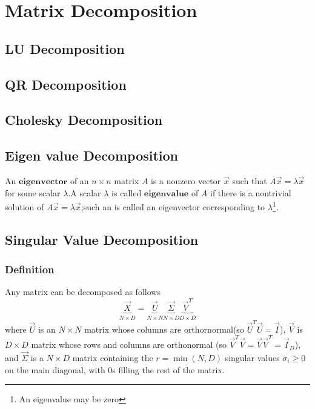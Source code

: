 \chapter{Matrix Decomposition}
\label{chapter:Matrix Decomposition}
\section{LU Decomposition}
\section{QR Decomposition}
\section{Cholesky Decomposition}
\section{Eigen value Decomposition}
\begin{definition}
	An $\mathbf{eigenvector}$ of an $n\times n$ matrix $A$ is a nonzero vector $\vec{x}$ such that $A\vec{x}=\lambda\vec{x}$ for some scalar $\lambda$.A scalar $\lambda$ is called $\mathbf{eigenvalue}$ of $A$ if there is a nontrivial solution  of $A\vec{x}=\lambda\vec{x}$;such an  is called an eigenvector corresponding to $\lambda$\footnote{An eigenvalue may be zero}.
\end{definition}


\section{Singular Value Decomposition}

\subsection{Definition}
\begin{definition}
	Any matrix can be decomposed as follows
	\begin{equation}\label{eqn:SVD}
	\underbrace{\vec{X}}_{N \times D}=\underbrace{\vec{U}}_{N \times N}\underbrace{\vec{\Sigma}}_{N \times D}\underbrace{\vec{V}^T}_{D \times D}
	\end{equation}
	where $\vec{U}$ is an $N \times N$ matrix whose columns are orthornormal(so $\vec{U}^T\vec{U}=\vec{I}$), $\vec{V}$ is $D \times D$ matrix whose rows and columns are orthonormal (so $\vec{V}^T\vec{V}=\vec{V}\vec{V}^T=\vec{I}_D$), and $\vec{\Sigma}$ is a $N \times D$ matrix containing the $r=\min(N,D)$ singular values $\sigma_i \geq 0$ on the main diagonal, with 0s filling the rest of the matrix.
\end{definition}
